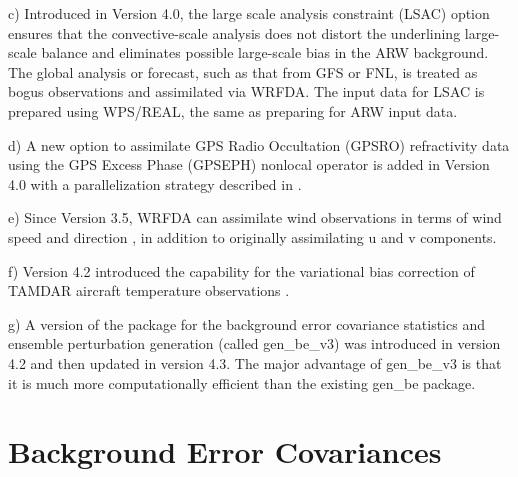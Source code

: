 \vspace{0.5cm}

c) Introduced in Version 4.0, the large scale analysis constraint (LSAC) option \citep{ven16} ensures that the convective-scale 
analysis does not distort the underlining large-scale balance and eliminates possible large-scale bias in the ARW background. The global analysis or forecast, such as that from GFS or FNL, is treated as bogus observations and assimilated via WRFDA. The input data for LSAC is prepared using WPS/REAL, the same as preparing for ARW input data.

\vspace{0.5cm}

d) A new option to assimilate GPS Radio Occultation (GPSRO) refractivity data using the GPS Excess Phase (GPSEPH)
nonlocal operator \citep{chen09} is added in Version 4.0 with a parallelization strategy described in \citep{zhang14b}.

\vspace{0.5cm}

e) Since Version 3.5, WRFDA can assimilate wind observations in terms of wind speed and direction \citep{huang13,gao15}, 
in addition to originally assimilating u and v components.

\vspace{0.5cm}

f) Version 4.2 introduced the capability for the variational bias correction of TAMDAR aircraft temperature observations \citep{gao19}.

\vspace{0.5cm}

g) A version of the package for the background error covariance statistics and ensemble perturbation generation (called gen\_be\_v3) 
was introduced in version 4.2 and then updated in version 4.3. The major advantage of gen\_be\_v3 is that it is much more 
computationally efficient than the existing gen\_be package.

\section{Background Error Covariances}
\label{var-be}


